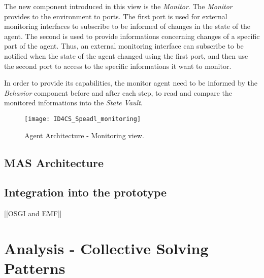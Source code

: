 The new component introduced in this view is the \emph{Monitor}. The \emph{Monitor} provides to the environment to ports. The first port is used for external monitoring interfaces to subscribe to be informed of changes in the state of the agent. The second is used to provide informations concerning changes of a specific part of the agent. Thus, an external monitoring interface can subscribe to be notified when the state of the agent changed using the first port, and then use the second port to access to the specific informations it want to monitor.

In order to provide its capabilities, the monitor agent need to be informed by the \emph{Behavior} component before and after each step, to read and compare the monitored informations into the \emph{State Vault}.

\begin{figure}
\centering
\texttt{[image: ID4CS\_Speadl\_monitoring]}
\caption{Agent Architecture - Monitoring view.}
\label{Arch-monitor}
\end{figure}

\section{MAS Architecture}

\section{Integration into the prototype}

[[OSGI and EMF]]

\chapter{Analysis - Collective Solving Patterns}